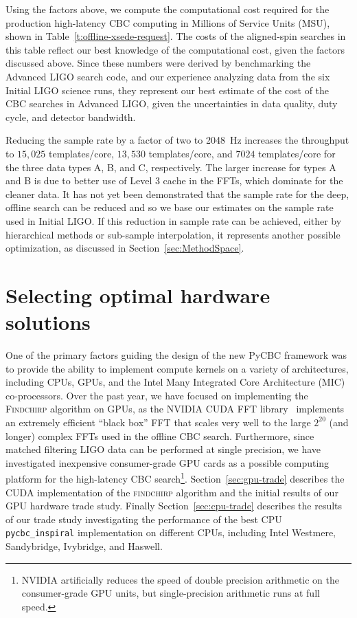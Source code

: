 Using the factors above, we compute the computational cost required for the
production high-latency CBC computing in Millions of Service Units (MSU), shown in
Table~\ref{t:offline-xsede-request}. The costs of the aligned-spin searches in
this table reflect our best knowledge of the computational cost, given the
factors discussed above.  Since these numbers were derived by benchmarking the
Advanced LIGO search code, and our experience analyzing data from the six Initial
LIGO science runs, they represent our best estimate of the
cost of the CBC searches in Advanced LIGO, given the uncertainties in data
quality, duty cycle, and detector bandwidth.

Reducing the
sample rate by a factor of two to 2048~Hz increases the throughput to
$15,025$ templates/core,  
$13,530$ templates/core, and
$7024$ templates/core for the three data types A, B, and C, respectively. 
The larger increase for types A and B is due to better use of Level 3 cache in the FFTs, which
dominate for the cleaner data. It has not yet been demonstrated
that the sample rate for the deep, offline search can be reduced and so we base our
estimates on the sample rate used in Initial LIGO. If this reduction in sample
rate can be
achieved, either by hierarchical methods or sub-sample interpolation, it
represents another possible optimization, as discussed in
Section~\ref{sec:MethodSpace}.

\vspace*{-10pt}
\section{Selecting optimal hardware solutions}
\vspace*{-05pt}
\label{sec:offline-trade-study}

One of the primary factors guiding the design of the new PyCBC framework was
to provide the ability to implement compute kernels on a variety of
architectures, including CPUs, GPUs, and the Intel Many Integrated Core
Architecture (MIC) co-processors. Over the past year, we have focused on
implementing the \textsc{Findchirp} algorithm on GPUs, as the NVIDIA CUDA FFT
library~\cite{cufft} implements an extremely efficient ``black box'' FFT that
scales very well to the large $2^{20}$ (and longer) complex FFTs used in the
offline CBC search. Furthermore, since matched filtering LIGO data
can be performed at single precision, we have investigated
inexpensive consumer-grade GPU cards as a possible computing platform for the
high-latency CBC search\footnote{NVIDIA artificially reduces the speed of
double precision arithmetic on the consumer-grade GPU units, but
single-precision arithmetic runs at full speed.}.  Section~\ref{sec:gpu-trade} describes the CUDA implementation of the
\textsc{findchirp} algorithm and the initial results of our GPU hardware trade
study. Finally Section~\ref{sec:cpu-trade} describes the results of our trade
study investigating the performance of the best CPU \texttt{pycbc\_inspiral}
implementation on different CPUs, including Intel Westmere, Sandybridge,
Ivybridge, and Haswell.

